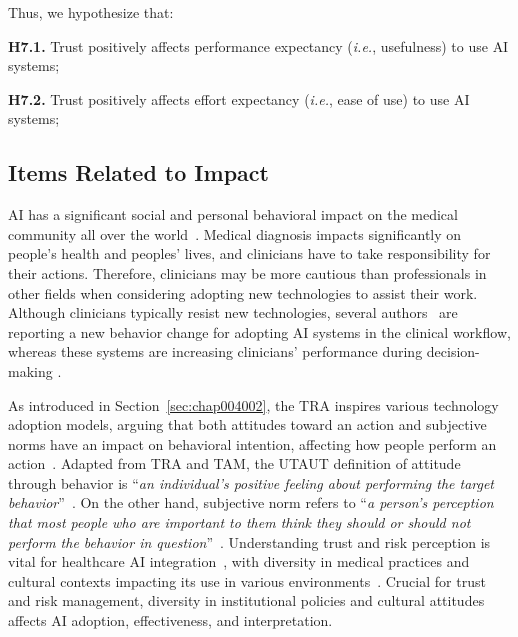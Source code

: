 
\noindent
Thus, we hypothesize that:

\vspace{2.00mm}

\noindent
{\bf H7.1.} Trust positively affects performance expectancy ({\it i.e.}, usefulness) to use \ac{AI} systems;

\vspace{2.00mm}

\noindent
{\bf H7.2.} Trust positively affects effort expectancy ({\it i.e.}, ease of use) to use \ac{AI} systems;


\subsection{Items Related to Impact}
\label{sec:chap004003003}

\ac{AI} has a significant social and personal behavioral impact on the medical community all over the world~\cite{CALISTO2022102922}.
Medical diagnosis impacts significantly on people's health and peoples' lives, and clinicians have to take responsibility for their actions.
Therefore, clinicians may be more cautious than professionals in other fields when considering adopting new technologies to assist their work.
Although clinicians typically resist new technologies, several authors~\cite{doi:10.1148/ryai.2020190043, WAYMEL2019327} are reporting a new behavior change for adopting \ac{AI} systems in the clinical workflow, whereas these systems are increasing clinicians' performance during decision-making \cite{CALISTO2021102607}.

As introduced in Section~\ref{sec:chap004002}, the \ac{TRA} inspires various technology adoption models, arguing that both attitudes toward an action and subjective norms have an impact on behavioral intention, affecting how people perform an action~\cite{CALISTO2022102922}.
Adapted from \ac{TRA} and \ac{TAM}, the \ac{UTAUT} definition of attitude through behavior is ``{\it an individual's positive feeling about performing the target behavior}''~\cite{KHALILZADEH2017460}.
On the other hand, subjective norm refers to ``{\it a person's perception that most people who are important to them think they should or should not perform the behavior in question}''~\cite{WAYMEL2019327}.
\textcolor{revised}{Understanding trust and risk perception is vital for healthcare \ac{AI} integration~\cite{CHOUDHURY2022103708}, with diversity in medical practices and cultural contexts impacting its use in various environments~\cite{Lambert2023}.
Crucial for trust and risk management, diversity in institutional policies and cultural attitudes affects \ac{AI} adoption, effectiveness, and interpretation.}

